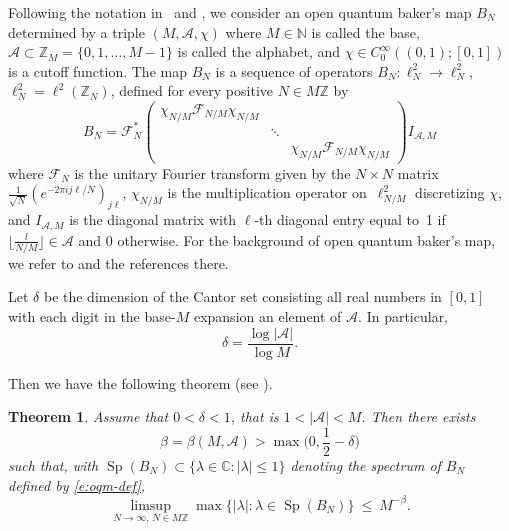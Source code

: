 \documentclass[reqno,12pt,letterpaper]{amsart}
\newtheorem{thm}[prop]{Theorem}
\numberwithin{equation}{section}
\numberwithin{prop}{section}
\DeclareMathOperator{\Sp}{Sp}
\begin{document}
Following the notation in~\cite{oqm} and \cite[Section 5]{regfup}, we consider an open quantum baker's map $B_N$
determined by a triple $(M,\mathcal{A},\chi)$ where $M\in\mathbb{N}$ is called the base, $\mathcal{A}\subset\mathbb{Z}_M=\{0,1,\ldots,M-1\}$ is called the alphabet, and $\chi\in C_0^\infty((0,1);[0,1])$ is a cutoff function.
The map $B_N$ is a sequence of operators 
 $B_N:\ell^2_N\to\ell^2_N$,
 $\ell^2_N=\ell^2(\mathbb Z_N)$, defined for every positive $N\in M\mathbb Z$ by
\begin{equation}
  \label{e:oqm-def}
B_N=\mathcal F_N^*\begin{pmatrix}
\chi_{N/M}\mathcal F_{N/M}\chi_{N/M} & \\
&\ddots&\\
 & &\chi_{N/M}\mathcal F_{N/M}\chi_{N/M}
\end{pmatrix}I_{\mathcal A, M}
\end{equation}
where $\mathcal F_N$ is the unitary Fourier transform given by the
$N\times N$ matrix $\frac{1}{\sqrt{N}}(e^{-2\pi ij\ell/N})_{j\ell}$, $\chi_{N/M}$ is the multiplication operator
on~$\ell^2_{N/M}$ discretizing $\chi$, and
$I_{\mathcal A,M}$ is the diagonal matrix
with $\ell$-th diagonal entry equal to~1 if $\lfloor\frac{l}{N/M}\rfloor\in\mathcal A$
and 0 otherwise. For the background of open quantum baker's map, we refer to \cite{oqm} and the references there.

Let $\delta$ be the dimension of the Cantor set consisting all real numbers in $[0,1]$ with each digit in the base-$M$ expansion an element of $\mathcal{A}$. In particular,
\begin{equation}
\label{e:dim-cantor}
\delta=\frac{\log|\mathcal{A}|}{\log M}.
\end{equation}

Then we have the following theorem (see \cite[Theorem 4]{regfup}).
\begin{thm}
  \label{t:gap-improves}
Assume that $0<\delta<1$, that is $1<|\mathcal A|<M$. Then there exists
\begin{equation}
  \label{e:improved-beta}
\beta=\beta(M,\mathcal A)>\max\Big(0,\frac{1}{2}-\delta\Big)
\end{equation}
such that, with $\Sp(B_N)\subset \{\lambda\in \mathbb C\colon |\lambda|\leq 1\}$ denoting the spectrum of $B_N$ defined by \eqref{e:oqm-def},
\begin{equation*}
\limsup_{N\to\infty,\,N\in M\mathbb Z}\max\{|\lambda|\colon \lambda\in\Sp(B_N)\}\ \leq\ M^{-\beta}.
\end{equation*}
\end{thm}
\end{document}
